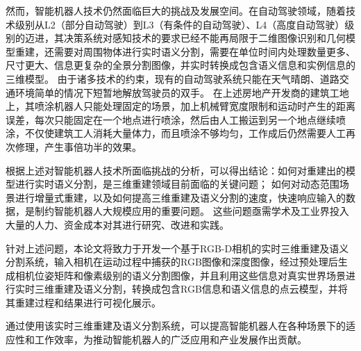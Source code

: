 \par 然而，智能机器人技术仍然面临巨大的挑战及发展空间。在自动驾驶领域，随着技术级别从L2（部分自动驾驶）到L3（有条件的自动驾驶）、L4（高度自动驾驶）级别\cite{unifiedAV}的迈进，其决策系统对感知技术的要求已经不能再局限于二维图像识别和几何模型重建，还需要对周围物体进行实时语义分割，需要在单位时间内处理数量更多、尺寸更大、信息更复杂的全景分割图像\cite{panopticsegmentation,electronics10161960}，并实时转换成包含语义信息和实例信息的三维模型。
由于诸多技术的约束，现有的自动驾驶系统只能在天气晴朗、道路交通环境简单的情况下短暂地解放驾驶员的双手\cite{s21165397}。
在上述房地产开发商的建筑工地上，其喷涂机器人只能处理固定的场景，加上机械臂宽度限制和运动时产生的距离误差，每次只能固定在一个地点进行喷涂，然后由人工搬运到另一个地点继续喷涂，不仅使建筑工人消耗大量体力，而且喷涂不够均匀，工作成后仍然需要人工再次修理，产生事倍功半的效果\cite{MANUELDAVILADELGADO2022101787}。

\par 根据上述对智能机器人技术所面临挑战的分析，可以得出结论：如何对重建出的模型进行实时语义分割，是三维重建领域目前面临的关键问题；
如何对动态范围场景进行增量式重建，以及如何提高三维重建及语义分割的速度，快速响应输入的数据，是制约智能机器人大规模应用的重要问题。
这些问题亟需学术及工业界投入大量的人力、资金成本对其进行研究、改进和实践。

\par 针对上述问题，本论文将致力于开发一个基于RGB-D相机的实时三维重建及语义分割系统，输入相机在运动过程中捕获的RGB图像和深度图像，经过预处理后生成相机位姿矩阵和像素级别的语义分割图像，并且利用这些信息对真实世界场景进行实时三维重建及语义分割，转换成包含RGB信息和语义信息的点云模型，并将其重建过程和结果进行可视化展示。

\par 通过使用该实时三维重建及语义分割系统，可以提高智能机器人在各种场景下的适应性和工作效率，为推动智能机器人的广泛应用和产业发展作出贡献。